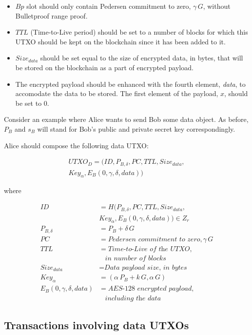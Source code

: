 \documentclass[a4paper, 10pt, conference]{ieeeconf}
\begin{document}
\begin{itemize}
	\item {$Bp$ slot should only contain Pedersen commitment to zero, $\gamma \, G$, without Bulletproof range proof.}
	\item {$TTL$ (Time-to-Live period) should be set to a number of blocks for which this UTXO should be kept on the blockchain since it has been added to it.}
	\item {$Size_{data}$ should be set equal to the size of encrypted data, in bytes, that will be stored on the blockchain as a part of encrypted payload.}
	\item {The encrypted payload should be enhanced with the fourth element, \textit{data}, to accomodate the data to be stored. The first element of the payload, $x$, should be set to 0.}
\end{itemize}

Consider an example where Alice wants to send Bob some data object. As before, $P_B$ and $s_B$ will stand for Bob's public and private secret key correspondingly. 

Alice should compose the following data UTXO:

\begin{multline*}
	UTXO_D = (ID, P_{B, \delta}, PC, TTL, Size_{data},\\
			Key_{\alpha}, E_B(0, \gamma, \delta, data))
\end{multline*}
	
	where
	
\begin{align*}
	ID &= H(P_{B, \delta}, PC, TTL, Size_{data}, \\ 
		& Key_{\alpha}, E_B(0, \gamma, \delta, data)) \in Z_r \\
	P_{B, \delta} &= P_B + \delta \, G \\
	PC &= \textit{Pedersen commitment to zero}, \gamma \, G \\
	TTL &= \textit{Time-to-Live of the UTXO},\\
	& \ \ \ \ \textit{in number of blocks} \\
	Size_{data} &= \textit{Data payload size, in bytes} \\
	Key_{\alpha} &= (\alpha \, P_{B} + k \, G, \alpha \, G ) \\
	E_B(0, \gamma, \delta, data) &= \textit{AES-128 encrypted payload}, \\
	& \ \ \ \ \textit{including the data}
\end{align*}

\subsection{Transactions involving data UTXOs}
\end{document}
